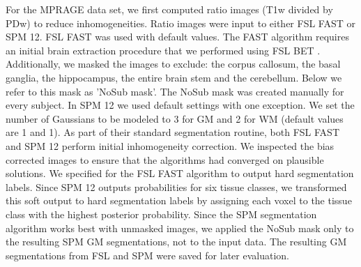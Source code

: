 For the MPRAGE data set, we first computed ratio images (T1w divided by PDw) \cite{Moortele2009} to reduce inhomogeneities. Ratio images were input to either FSL FAST or SPM 12. FSL FAST was used with default values. The FAST algorithm requires an initial brain extraction procedure that we performed using FSL BET \cite{Smith2002}. Additionally, we masked the images to exclude: the corpus callosum, the basal ganglia, the hippocampus, the entire brain stem and the cerebellum. Below we refer to this mask as 'NoSub mask'. The NoSub mask was created manually for every subject. In SPM 12 we used default settings with one exception. We set the number of Gaussians to be modeled to 3 for GM and 2 for WM (default values are 1 and 1). As part of their standard segmentation routine, both FSL FAST and SPM 12 perform initial inhomogeneity correction. We inspected the bias corrected images to ensure that the algorithms had converged on plausible solutions. We specified for the FSL FAST algorithm to output hard segmentation labels. Since SPM 12 outputs probabilities for six tissue classes, we transformed this soft output to hard segmentation labels by assigning each voxel to the tissue class with the highest posterior probability. Since the SPM segmentation algorithm works best with unmasked images, we applied the NoSub mask only to the resulting SPM GM segmentations, not to the input data. The resulting GM segmentations from FSL and SPM were saved for later evaluation.

